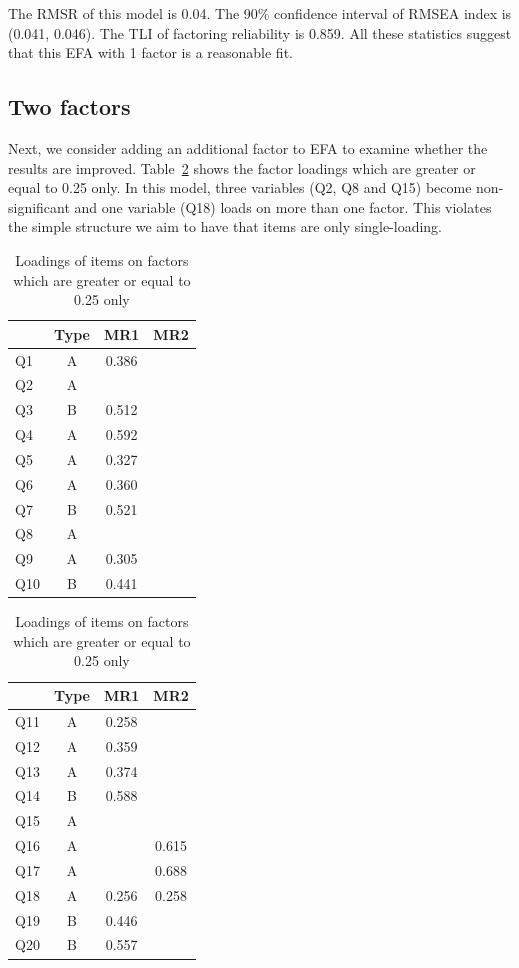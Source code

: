 \documentclass[a4paper]{report}
\begin{document}
The RMSR of this model is 0.04. The 90\% confidence interval of RMSEA index is (0.041, 0.046). The TLI of factoring reliability is 0.859. All these statistics suggest that this EFA with 1 factor is a reasonable fit. 

\subsection{Two factors}

Next, we consider adding an additional factor to EFA to examine whether the results are improved. Table~\ref{tab:EFA_pre17_2} shows the factor loadings which are greater or equal to 0.25 only. In this model, three variables (Q2, Q8 and Q15) become non-significant and one variable (Q18) loads on more than one factor. This violates the simple structure we aim to have that items are only single-loading. 

\begin{table}[ht]
  \begin{minipage}{0.5\linewidth}
    \centering
    \begin{tabular}{lccc}
      \hline
     & Type & MR1 & MR2 \\ 
      \hline
    Q1 & A & 0.386 &  \\ 
      Q2 & A &  &  \\ 
      Q3 & B & 0.512 &  \\ 
      Q4 & A & 0.592 &  \\ 
      Q5 & A & 0.327 &  \\ 
      Q6 & A & 0.360 &  \\ 
      Q7 & B & 0.521 &  \\ 
      Q8 & A &  &  \\ 
      Q9 & A & 0.305 &  \\ 
      Q10 & B & 0.441 &  \\ 
       \hline
    \end{tabular}
  \end{minipage}%
  \begin{minipage}{0.5\linewidth}
    \centering
    \begin{tabular}{lccc}
      \hline
    & Type & MR1 & MR2 \\ 
      \hline
    Q11 & A & 0.258 &  \\ 
      Q12 & A & 0.359 &  \\ 
      Q13 & A & 0.374 &  \\ 
      Q14 & B & 0.588 &  \\ 
      Q15 & A &  &  \\ 
      Q16 & A &  & 0.615 \\ 
      Q17 & A &  & 0.688 \\ 
      Q18 & A & 0.256 & 0.258 \\ 
      Q19 & B & 0.446 &  \\ 
      Q20 & B & 0.557 &  \\ 
      \hline
    \end{tabular}
  \end{minipage}
  \caption{\label{tab:EFA_pre17_2}Loadings of items on factors which are greater or equal to 0.25 only}
\end{table}
\end{document}
